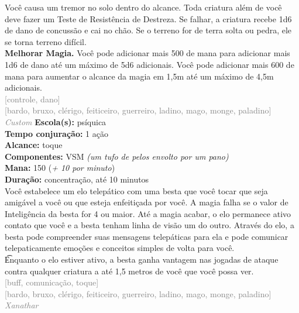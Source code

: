 \documentclass{RPG_Adventure}[2021/10/20]
\begin{document}
{\normalsize Você causa um tremor no solo dentro do alcance. Toda criatura além de você deve fazer um Teste de Resistência de Destreza. Se falhar, a criatura recebe 1d6 de dano de concussão e cai no chão. Se o terreno for de terra solta ou pedra, ele se torna terreno difícil.\\\t \textbf{Melhorar Magia.} Você pode adicionar mais 500 de mana para adicionar mais 1d6 de dano até um máximo de 5d6 adicionais. Você pode adicionar mais 600 de mana para aumentar o alcance da magia em 1,5m até um máximo de 4,5m adicionais.\\}
{\scriptsize \textcolor{gray}{[controle, dano]\\}}
{\scriptsize \textcolor{gray}{[bardo, bruxo, clérigo, feiticeiro, guerreiro, ladino, mago, monge, paladino]\\}}
{\tiny \textcolor{gray}{\textit{Custom}}}
{\small \t \textbf{Escola(s):} psíquica\\\t \textbf{Tempo conjuração:} 1 ação\\\t \textbf{Alcance:} toque\\\t \textbf{Componentes:} VSM \textit{(um tufo de pelos envolto por um pano)}\\\t \textbf{Mana:} 150 (\textit{+ 10 por minuto})\\\t \textbf{Duração:} concentração, até 10 minutos\\}
{\normalsize Você estabelece um elo telepático com uma besta que você tocar que seja amigável a você ou que esteja enfeitiçada por você. A magia falha se o valor de Inteligência da besta for 4 ou maior. Até a magia acabar, o elo permanece ativo contato que você e a besta tenham linha de visão um do outro. Através do elo, a besta pode compreender suas mensagens telepáticas para ela e pode comunicar telepaticamente emoções e conceitos simples de volta para você.\\\t Enquanto o elo estiver ativo, a besta ganha vantagem nas jogadas de ataque contra qualquer criatura a até 1,5 metros de você que você possa ver.\\}
{\scriptsize \textcolor{gray}{[buff, comunicação, toque]\\}}
{\scriptsize \textcolor{gray}{[bardo, bruxo, clérigo, feiticeiro, guerreiro, ladino, mago, monge, paladino]\\}}
{\tiny \textcolor{gray}{\textit{Xanathar}}}
\end{document}
